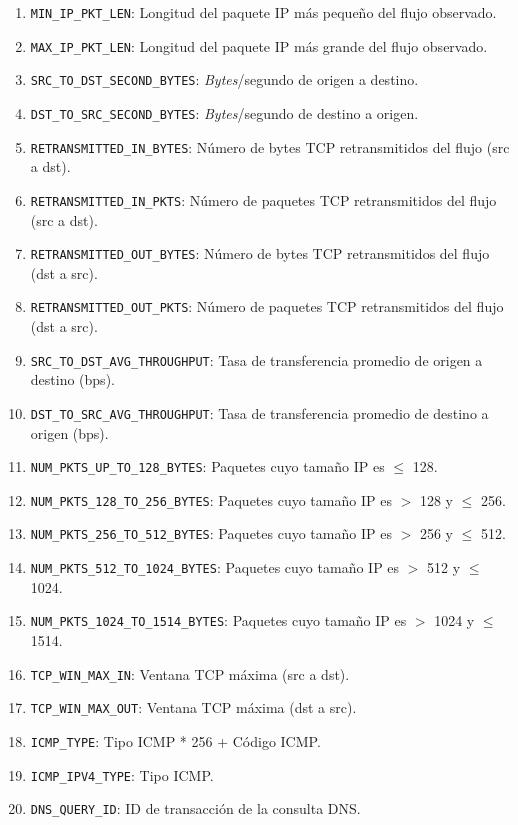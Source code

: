 \begin{enumerate}
    \item \texttt{MIN\_IP\_PKT\_LEN}: Longitud del paquete IP más pequeño del flujo observado.
    \item \texttt{MAX\_IP\_PKT\_LEN}: Longitud del paquete IP más grande del flujo observado.
    \item \texttt{SRC\_TO\_DST\_SECOND\_BYTES}: \textit{Bytes}/segundo de origen a destino.
    \item \texttt{DST\_TO\_SRC\_SECOND\_BYTES}: \textit{Bytes}/segundo de destino a origen.
    \item \texttt{RETRANSMITTED\_IN\_BYTES}: Número de bytes TCP retransmitidos del flujo (src a dst).
    \item \texttt{RETRANSMITTED\_IN\_PKTS}: Número de paquetes TCP retransmitidos del flujo (src a dst).
    \item \texttt{RETRANSMITTED\_OUT\_BYTES}: Número de bytes TCP retransmitidos del flujo (dst a src).
    \item \texttt{RETRANSMITTED\_OUT\_PKTS}: Número de paquetes TCP retransmitidos del flujo (dst a src).
    \item \texttt{SRC\_TO\_DST\_AVG\_THROUGHPUT}: Tasa de transferencia promedio de origen a destino (bps).
    \item \texttt{DST\_TO\_SRC\_AVG\_THROUGHPUT}: Tasa de transferencia promedio de destino a origen (bps).
    \item \texttt{NUM\_PKTS\_UP\_TO\_128\_BYTES}: Paquetes cuyo tamaño IP es $ \leq $ 128.
    \item \texttt{NUM\_PKTS\_128\_TO\_256\_BYTES}: Paquetes cuyo tamaño IP es  $ > $ 128 y $ \leq $ 256.
    \item \texttt{NUM\_PKTS\_256\_TO\_512\_BYTES}: Paquetes cuyo tamaño IP es $ > $ 256 y $ \leq $ 512.
    \item \texttt{NUM\_PKTS\_512\_TO\_1024\_BYTES}: Paquetes cuyo tamaño IP es $ > $ 512 y $ \leq $ 1024.
    \item \texttt{NUM\_PKTS\_1024\_TO\_1514\_BYTES}: Paquetes cuyo tamaño IP es $ > $ 1024 y $ \leq $ 1514.
    \item \texttt{TCP\_WIN\_MAX\_IN}: Ventana TCP máxima (src a dst).
    \item \texttt{TCP\_WIN\_MAX\_OUT}: Ventana TCP máxima (dst a src).
    \item \texttt{ICMP\_TYPE}: Tipo ICMP * 256 + Código ICMP.
    \item \texttt{ICMP\_IPV4\_TYPE}: Tipo ICMP.
    \item \texttt{DNS\_QUERY\_ID}: ID de transacción de la consulta DNS.

\end{enumerate}
